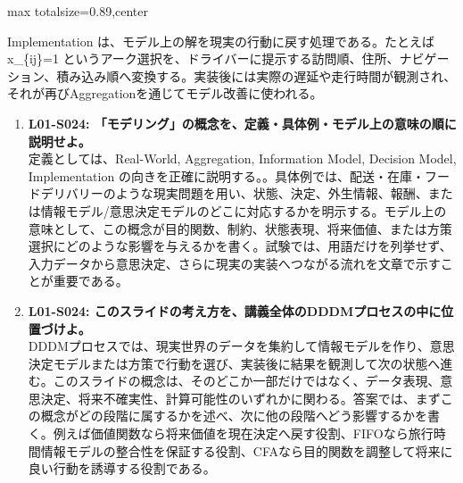 \begin{minipage}[t]{0.58\textwidth}
\begin{adjustbox}{max totalsize={\textwidth}{0.89\textheight},center}
\begin{minipage}{\textwidth}
Implementation は、モデル上の解を現実の行動に戻す処理である。たとえば x\_\{ij\}=1 というアーク選択を、ドライバーに提示する訪問順、住所、ナビゲーション、積み込み順へ変換する。実装後には実際の遅延や走行時間が観測され、それが再びAggregationを通じてモデル改善に使われる。\par{}\begin{enumerate}\item \textbf{L01-S024: 「モデリング」の概念を、定義・具体例・モデル上の意味の順に説明せよ。}\\定義としては、Real-World, Aggregation, Information Model, Decision Model, Implementation の向きを正確に説明する。。具体例では、配送・在庫・フードデリバリーのような現実問題を用い、状態、決定、外生情報、報酬、または情報モデル/意思決定モデルのどこに対応するかを明示する。モデル上の意味として、この概念が目的関数、制約、状態表現、将来価値、または方策選択にどのような影響を与えるかを書く。試験では、用語だけを列挙せず、入力データから意思決定、さらに現実の実装へつながる流れを文章で示すことが重要である。\item \textbf{L01-S024: このスライドの考え方を、講義全体のDDDMプロセスの中に位置づけよ。}\\DDDMプロセスでは、現実世界のデータを集約して情報モデルを作り、意思決定モデルまたは方策で行動を選び、実装後に結果を観測して次の状態へ進む。このスライドの概念は、そのどこか一部だけではなく、データ表現、意思決定、将来不確実性、計算可能性のいずれかに関わる。答案では、まずこの概念がどの段階に属するかを述べ、次に他の段階へどう影響するかを書く。例えば価値関数なら将来価値を現在決定へ戻す役割、FIFOなら旅行時間情報モデルの整合性を保証する役割、CFAなら目的関数を調整して将来に良い行動を誘導する役割である。\end{enumerate}
\end{minipage}
\end{adjustbox}
\end{minipage}


